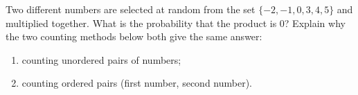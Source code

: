 Two different numbers are selected at random from the set $\{-2,-1,0,3,4,5\}$ and multiplied together. What is the probability that the product is $0$? Explain why the two counting methods below both give the same answer:
\begin{enumerate}
\item[(i)] counting unordered pairs of numbers;
\item[(ii)] counting ordered pairs (first number, second number).
\end{enumerate}
